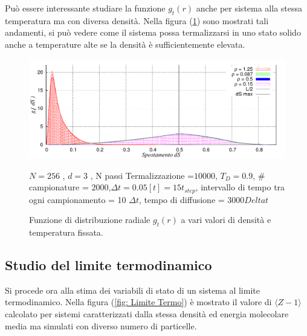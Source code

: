 Può essere interessante studiare la funzione $g_t(r)$ anche per sistema alla stessa temperatura ma con diversa densità.
Nella figura (\ref{fig: Problema11_v2A}) sono mostrati tali andamenti, si può vedere come il sistema possa termalizzarsi in uno stato solido anche a temperature alte se la densità è sufficientemente elevata.
	\begin{figure}[htbp]
		\centering
		\caption[Sfere Soffici$/$Problema11$\_$v2A.cpp]{Funzione di distribuzione radiale $g_t(r)$ a vari valori di densità e temperatura fissata.}\label{fig: Problema11_v2A}\vspace{-15pt}

		\includegraphics[scale=0.95]{Immagini/Soffici/DistrodS_Rho_3D}
		
		\centering  \footnotesize{$N= 256$ , $d=3$ , N passi Termalizzazione =$ 10000$, $T_D = 0.9$, $\#$ campionature = $ 2000$,\newline $\Delta t = 0.05 [t] = 15 t_{step}$, intervallo di tempo tra ogni campionamento = 10 $\Delta t$, tempo di diffusione = $3000 Delta t$}
	\end{figure}



\FloatBarrier 
\subsection{Studio del limite termodinamico}
Si procede ora alla stima dei variabili di stato di un sistema al limite termodinamico. Nella figura (\ref{fig: Limite Termo}) è mostrato il valore di $\langle Z-1 \rangle$  calcolato per sistemi caratterizzati dalla stessa densità ed energia molecolare media ma simulati con diverso numero di particelle.

